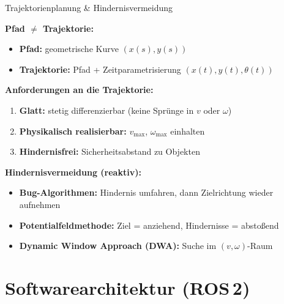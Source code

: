 \documentclass[%
  aspectratio=169,
  10pt
]{beamer}
\newcommand{\hl}[1]{{\color{fbblau}\textbf{#1}}}
\begin{document}
\begin{frame}{Trajektorienplanung \& Hindernisvermeidung}

\textbf{Pfad $\neq$ Trajektorie:}
\begin{itemize}
  \item \textbf{Pfad:} geometrische Kurve $(x(s), y(s))$
  \item \textbf{Trajektorie:} Pfad + Zeitparametrisierung
        $(x(t), y(t), \theta(t))$
\end{itemize}

\vspace{2mm}
\textbf{Anforderungen an die Trajektorie:}
\begin{enumerate}
  \item \hl{Glatt:} stetig differenzierbar (keine Sprünge in $v$ oder $\omega$)
  \item \hl{Physikalisch realisierbar:} $v_\mathrm{max}$, $\omega_\mathrm{max}$
        einhalten
  \item \hl{Hindernisfrei:} Sicherheitsabstand zu Objekten
\end{enumerate}

\vspace{3mm}
\textbf{Hindernisvermeidung (reaktiv):}
\begin{itemize}
  \item \textbf{Bug-Algorithmen:} Hindernis umfahren, dann Zielrichtung wieder aufnehmen
  \item \textbf{Potentialfeldmethode:} Ziel = anziehend, Hindernisse = abstoßend
  \item \textbf{Dynamic Window Approach (DWA):} Suche im $(v,\omega)$-Raum
\end{itemize}

\end{frame}


\section{Softwarearchitektur (ROS\,2)}
\end{document}

